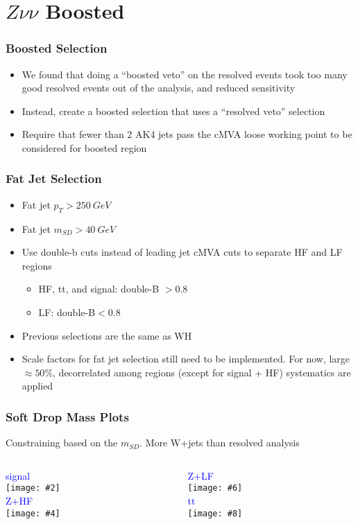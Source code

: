 \documentclass{beamer}
\newcommand{\fourfigs}[8]{
  \begin{columns}
    \begin{column}{0.3\linewidth}
      \centering
      \textcolor{blue}{#1} \\
      \texttt{[image: \#2]} \\
      \textcolor{blue}{#3} \\
      \texttt{[image: \#4]}
    \end{column}
    \begin{column}{0.3\linewidth}
      \centering
      \textcolor{blue}{#5} \\
      \texttt{[image: \#6]} \\
      \textcolor{blue}{#7} \\
      \texttt{[image: \#8]}
    \end{column}
  \end{columns}
}
\begin{document}
\section{$Z\nu\nu$ Boosted}

\begin{frame}
  \frametitle{Boosted Selection}
  \begin{itemize}
  \item We found that doing a ``boosted veto'' on the resolved events took too many
    good resolved events out of the analysis, and reduced sensitivity
  \item Instead, create a boosted selection that uses a ``resolved veto'' selection
  \item Require that fewer than 2 AK4 jets pass the cMVA loose working point to be considered
    for boosted region
  \end{itemize}
\end{frame}

\begin{frame}
  \frametitle{Fat Jet Selection}
  \begin{itemize}
  \item Fat jet $p_T > \SI{250}{GeV}$
  \item Fat jet $m_{SD} > \SI{40}{GeV}$
  \item Use double-b cuts instead of leading jet cMVA cuts to separate HF and LF regions
    \begin{itemize}
    \item HF, tt, and signal: double-B $> 0.8$
    \item LF: double-B$< 0.8$
    \end{itemize}
  \item Previous selections are the same as WH
  \item Scale factors for fat jet selection still need to be implemented.
    For now, large $\approx 50\%$, decorrelated among regions (except for signal + HF)
    systematics are applied
  \end{itemize}
\end{frame}

\begin{frame}
  \frametitle{Soft Drop Mass Plots}
  Constraining based on the $m_{SD}$. More W+jets than resolved analysis

  \fourfigs{signal}
           {180327_v4/boosted_signal_fatjet1_mSD_corr}
           {Z+HF}
           {180328_v1/boosted_heavyz_fatjet1_mSD_corr}
           {Z+LF}
           {180327_v4/boosted_lightz_fatjet1_mSD_corr}
           {tt}
           {180327_v4/boosted_tt_fatjet1_mSD_corr}
\end{frame}
\end{document}

